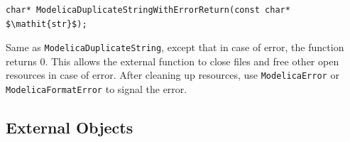 \begin{functiondefinition}[ModelicaDuplicateStringWithErrorReturn]
\begin{synopsis}[C]\begin{lstlisting}
char* ModelicaDuplicateStringWithErrorReturn(const char* $\mathit{str}$);
\end{lstlisting}\end{synopsis}
\begin{semantics}
Same as {\lstinline[language=C]!ModelicaDuplicateString!}, except that in case of error, the function returns 0.
This allows the external function to close files and free other open resources in case of error.
After cleaning up resources, use {\lstinline[language=C]!ModelicaError!} or {\lstinline[language=C]!ModelicaFormatError!} to signal the error.
\end{semantics}
\end{functiondefinition}

\subsection{External Objects}\label{external-objects}

